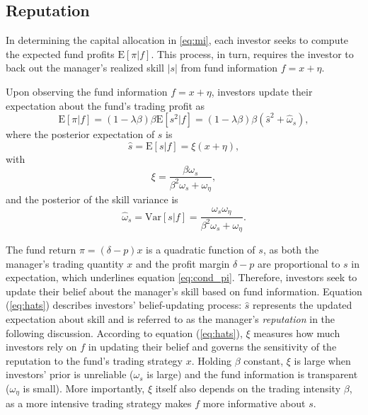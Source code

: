 \subsection{Reputation}
In determining the capital allocation in \eqref{eq:mi}, each investor seeks to compute the expected fund profits $\mathrm{E}[\pi|f]$. This process, in turn, requires the investor to back out the manager's realized skill $|s|$ from fund information $f=x+\eta$. 
\begin{lemma}\label{lem:reputation}
	Upon observing the fund information $f=x+\eta$, investors update their expectation about the fund's trading profit as
	\begin{equation}
         \mathrm{E}\left[\pi|f\right] =(1-\lambda \beta)\beta\mathrm{E}[s^2|f]  = (1-\lambda \beta)\beta\left(\hat{s}^2 + \hat{\omega}_{s}\right),\label{eq:cond_pi}
     \end{equation}
     where the posterior expectation of $s$ is
     \begin{equation}
         \hat{s} = \mathrm{E}[s|f] = \xi(x+\eta),\label{eq:hats}
     \end{equation}
     with 
	 \begin{equation}
		\xi = \frac{\beta\omega_{s}}{\beta^2 \omega_{s}+\omega_{\eta}},\label{eq:xi}
	 \end{equation}
	 and the posterior of the skill variance is
     \begin{equation}
         \hat{\omega}_{s} = \mathrm{Var}[s|f] = \frac{\omega_{s}\omega_{\eta}}{\beta^2 \omega_{s} + \omega_{\eta}}.\label{eq:cond_var}
     \end{equation}
 \end{lemma}
 The fund return $\pi=(\delta-p)x$ is a quadratic function of $s$, as both the manager's trading quantity $x$ and the profit margin $\delta-p$ are proportional to $s$ in expectation, which underlines equation \eqref{eq:cond_pi}. Therefore, investors seek to update their belief about the manager's skill based on fund information.
 Equation (\ref{eq:hats}) describes investors' belief-updating process: $\hat{s}$ represents the updated expectation about skill and is referred to as the manager's \textit{reputation} in the following discussion. According to equation (\ref{eq:hats}), $\xi$ measures how much investors rely on $f$ in updating their belief and governs the sensitivity of the reputation to the fund's trading strategy $x$. Holding $\beta$ constant, $\xi$ is large when investors' prior is unreliable ($\omega_{s}$ is large) and the fund information is transparent ($\omega_{\eta}$ is small). More importantly, $\xi$ itself also depends on the trading intensity $\beta$, as a more intensive trading strategy makes $f$ more informative about $s$.

